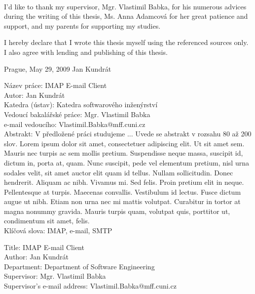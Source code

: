 \documentclass[12pt,notitlepage]{report}
\begin{document}
\normalsize
\setcounter{page}{2}
\ \vspace{10mm} 

\noindent I'd like to thank my supervisor, Mgr. Vlastimil Babka, for his
numerous advices during the writing of this thesis, Ms. Anna Adamcová for her
great patience and support, and my parents for supporting my studies.

\vspace{\fill}
\noindent I hereby declare that I wrote this thesis myself using the referenced
sources only. I also agree with lending and publishing of this thesis.

\bigskip
\noindent Prague, May 29, 2009 \hspace{\fill}Jan Kundrát\\

\tableofcontents

\newpage

\noindent
Název práce: IMAP E-mail Client\\
Autor: Jan Kundrát\\
Katedra (ústav): Katedra softwarového inženýrství\\
Vedoucí bakalářské práce: Mgr. Vlastimil Babka\\
e-mail vedoucího: Vlastimil.Babka@mff.cuni.cz\\

\noindent Abstrakt:  V předložené práci studujeme ... Uvede se abstrakt v
rozsahu 80 až 200 slov. Lorem ipsum dolor sit amet, consectetuer adipiscing
elit. Ut sit amet sem. Mauris nec turpis ac sem mollis pretium. Suspendisse
neque massa, suscipit id, dictum in, porta at, quam. Nunc suscipit, pede vel
elementum pretium, nisl urna sodales velit, sit amet auctor elit quam id tellus.
Nullam sollicitudin. Donec hendrerit. Aliquam ac nibh. Vivamus mi. Sed felis.
Proin pretium elit in neque. Pellentesque at turpis. Maecenas convallis.
Vestibulum id lectus. Fusce dictum augue ut nibh. Etiam non urna nec mi mattis
volutpat. Curabitur in tortor at magna nonummy gravida. Mauris turpis quam,
volutpat quis, porttitor ut, condimentum sit amet, felis.\\

\noindent Klíčová slova: IMAP, e-mail, SMTP

\vspace{10mm}

\noindent
Title: IMAP E-mail Client\\
Author: Jan Kundrát\\
Department: Department of Software Engineering\\
Supervisor: Mgr. Vlastimil Babka\\
Supervisor's e-mail address: Vlastimil.Babka@mff.cuni.cz\\
\end{document}
